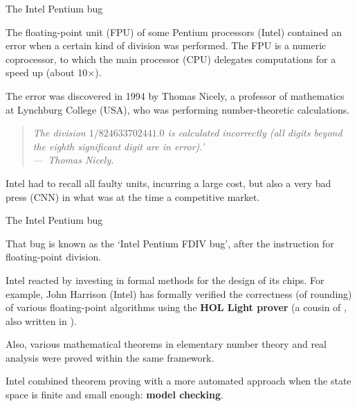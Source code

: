 \documentclass[compress,dvips,xcolor={dvipsnames},t]{beamer}
\begin{document}
%
\begin{frame}{The Intel Pentium bug}

  The floating-point unit (FPU) of some Pentium processors (Intel)
  contained an error when a certain kind of division was
  performed. The FPU is a numeric coprocessor, to which the main
  processor (CPU) delegates computations for a speed up (about
  10$\times$).

  \bigskip

  The error was discovered in 1994 by Thomas Nicely, a professor of
  mathematics at Lynchburg College (USA), who was performing
  number\hyp{}theoretic calculations.

  \medskip

  \begin{quote}
    \it The division \(1/824633702441.0\) is calculated incorrectly
    (all digits beyond the eighth significant digit are in error).'
    \\ \hfill ---~Thomas Nicely.
  \end{quote}
  Intel had to recall all faulty units, incurring a large cost, but
  also a very bad press (CNN) in what was at the time a competitive
  market.

\end{frame}

%
\begin{frame}{The Intel Pentium bug}

  That bug is known as the `Intel Pentium FDIV bug', after the
  instruction for floating\hyp{}point division.

  \bigskip

  Intel reacted by investing in formal methods for the design of its
  chips. For example, John Harrison (Intel) has formally verified the
  correctness (of rounding) of various floating\hyp{}point algorithms
  using the \textbf{HOL Light prover} (a cousin of \Coq, also written
  in \OCaml).

  \bigskip

  Also, various mathematical theorems in elementary number theory and
  real analysis were proved within the same framework.

  \bigskip

  Intel combined theorem proving with a more automated approach when
  the state space is finite and small enough: \textbf{model checking}.

\end{frame}
\end{document}
